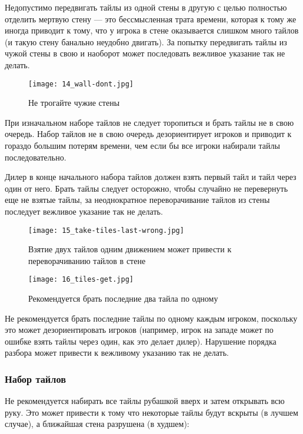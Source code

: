 Недопустимо передвигать тайлы из одной стены в другую с целью полностью отделить мертвую стену --- это бессмысленная трата времени, которая к тому же иногда приводит к тому, что у игрока в стене оказывается слишком много тайлов (и такую стену банально неудобно двигать). За попытку передвигать тайлы из чужой стены в свою и наоборот может последовать вежливое указание так не делать.

\begin{figure}[H]
	\centering
	\texttt{[image: 14\_wall-dont.jpg]}
	\caption{Не трогайте чужие стены}
\end{figure}

При изначальном наборе тайлов не следует торопиться и брать тайлы не в свою очередь. Набор тайлов не в свою очередь дезориентирует игроков и приводит к гораздо большим потерям времени, чем если бы все игроки набирали тайлы последовательно.

Дилер в конце начального набора тайлов должен взять первый тайл и тайл через один от него. Брать тайлы следует осторожно, чтобы случайно не перевернуть еще не взятые тайлы, за неоднократное переворачивание тайлов из стены последует вежливое указание так не делать.

\begin{figure}[H]
	\centering
	\texttt{[image: 15\_take-tiles-last-wrong.jpg]}
	\caption{\centering Взятие двух тайлов одним движением может \linebreak привести к переворачиванию тайлов в стене}
\end{figure}

\begin{figure}[H]
	\centering
	\texttt{[image: 16\_tiles-get.jpg]}
	\caption{Рекомендуется брать последние два тайла по одному}
\end{figure}

Не рекомендуется брать последние тайлы по одному каждым игроком, поскольку это может дезориентировать игроков (например, игрок на западе может по ошибке взять тайлы через один, как это делает дилер). Нарушение порядка разбора может привести к вежливому указанию так не делать.

\subsubsection{Набор тайлов}

Не рекомендуется набирать все тайлы рубашкой вверх и затем открывать всю руку. Это может привести к тому что некоторые тайлы будут вскрыты (в лучшем случае), а ближайшая стена разрушена (в худшем):


